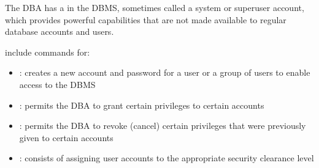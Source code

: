    \par The DBA has a  in the DBMS, sometimes called a system or superuser account, which provides powerful capabilities that are not made available to regular database accounts and users.
    \par {} include commands for:
      \begin{itemize}
        \item {}: creates a new account and password for a user or a group of users to enable access to the DBMS
        \item {}: permits the DBA to grant certain privileges to certain accounts
        \item {}: permits the DBA to revoke (cancel) certain privileges that were previously given to certain accounts
        \item {}: consists of assigning user accounts to the appropriate security clearance level
      \end{itemize}




